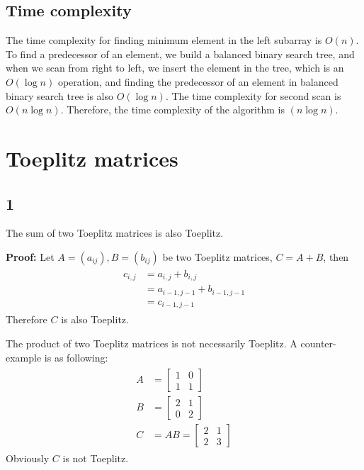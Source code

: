 \documentclass[paper=a4, fontsize=11pt]{scrartcl} %
\numberwithin{equation}{section} %
\numberwithin{figure}{section} %
\numberwithin{table}{section} %
\numberwithin{claimcounter}{section}
\begin{document}
\subsection*{Time complexity}
The time complexity for finding minimum element in the left subarray is $O(n)$.
To find a predecessor of an element, we build a balanced binary search tree,
and when we scan from right to left, we insert the element in the tree, which is 
an $O(\log n)$ operation, and finding the predecessor of an element in balanced
binary search tree is also $O(\log n)$. The time complexity for
second scan is $O(n\log n)$. Therefore, the time complexity of the algorithm is
$(n\log n)$.

\section{Toeplitz matrices}
\subsection*{1}
The sum of two Toeplitz matrices is also Toeplitz.

\textbf{Proof:}
Let $A = (a_{ij}), B = (b_{ij})$ be two Toeplitz matrices, $C = A + B$, then
\begin{align}
  \begin{split}
    c_{i,j} &= a_{i,j} + b_{i,j} \\
           &= a_{i-1,j-1} + b_{i-1,j-1} \\
           &= c_{i-1,j-1} 
  \end{split}
\end{align}
Therefore $C$ is also Toeplitz.

The product of two Toeplitz matrices is not necessarily Toeplitz. A
counter-example is as following:
\begin{align}
  \begin{split}
    A &= \begin{bmatrix}
      1 & 0 \\
      1 & 1 
    \end{bmatrix} \\
    B &= \begin{bmatrix}
      2 & 1 \\
      0 & 2 
    \end{bmatrix} \\
    C &= AB = \begin{bmatrix}
      2 & 1 \\
      2 & 3 
    \end{bmatrix}
  \end{split}
\end{align}
Obviously $C$ is not Toeplitz.
\end{document}
